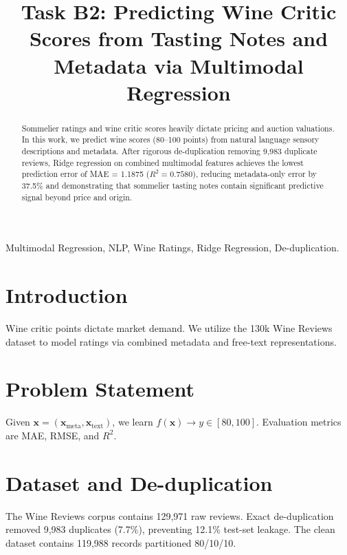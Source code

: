 \documentclass[conference]{IEEEtran}
\begin{document}
\title{Task B2: Predicting Wine Critic Scores from Tasting Notes and Metadata via Multimodal Regression}

\author{
}

\maketitle

\begin{abstract}
Sommelier ratings and wine critic scores heavily dictate pricing and auction valuations. In this work, we predict wine scores (80--100 points) from natural language sensory descriptions and metadata. After rigorous de-duplication removing 9,983 duplicate reviews, Ridge regression on combined multimodal features achieves the lowest prediction error of MAE = 1.1875 ($R^2 = 0.7580$), reducing metadata-only error by 37.5\% and demonstrating that sommelier tasting notes contain significant predictive signal beyond price and origin.
\end{abstract}

\begin{IEEEkeywords}
Multimodal Regression, NLP, Wine Ratings, Ridge Regression, De-duplication.
\end{IEEEkeywords}

\section{Introduction}
Wine critic points dictate market demand. We utilize the 130k Wine Reviews dataset to model ratings via combined metadata and free-text representations.

\section{Problem Statement}
Given $\mathbf{x} = (\mathbf{x}_{\text{meta}}, \mathbf{x}_{\text{text}})$, we learn $f(\mathbf{x}) \to y \in [80, 100]$. Evaluation metrics are MAE, RMSE, and $R^2$.

\section{Dataset and De-duplication}
The Wine Reviews corpus contains 129,971 raw reviews. Exact de-duplication removed 9,983 duplicates (7.7\%), preventing 12.1\% test-set leakage. The clean dataset contains 119,988 records partitioned 80/10/10.
\end{document}

